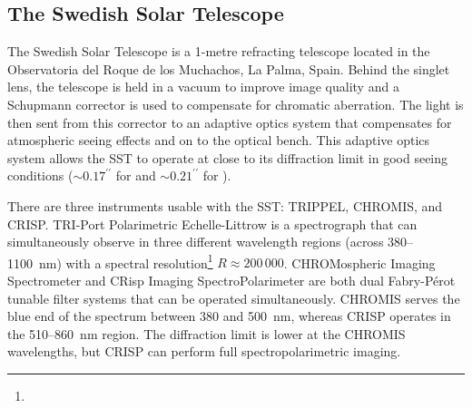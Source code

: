 \subsection{The Swedish Solar Telescope}\label{Sec:CRISP}

The Swedish Solar Telescope \citep[SST,][]{Scharmer2003} is a 1-metre refracting telescope located in the Observatoria del Roque de los Muchachos, La Palma, Spain.
Behind the singlet lens, the telescope is held in a vacuum to improve image quality and a Schupmann corrector is used to compensate for chromatic aberration.
The light is then sent from this corrector to an adaptive optics system that compensates for atmospheric seeing effects and on to the optical bench.
This adaptive optics system allows the SST to operate at close to its diffraction limit in good seeing conditions ($\sim 0.17^{\prime\prime}$ for \Ha{} and $\sim 0.21^{\prime\prime}$ for \CaLine{}). %

There are three instruments usable with the SST: TRIPPEL, CHROMIS, and CRISP.
TRI-Port Polarimetric Echelle-Littrow \citep[TRIPPEL,][]{Kiselman2011} is a spectrograph that can simultaneously observe in three different wavelength regions (across 380--\SI{1100}{\nano\m}) with a spectral resolution\footnote{} $R\approx200\,000$.
CHROMospheric Imaging Spectrometer \citep[CHROMIS,][]{Lofdahl2021} and CRisp Imaging SpectroPolarimeter \citep[CRISP,][]{Scharmer2008,Scharmer2019} are both dual Fabry-Pérot tunable filter systems that can be operated simultaneously.
CHROMIS serves the blue end of the spectrum between 380 and \SI{500}{\nano\m}, whereas CRISP operates in the 510--\SI{860}{\nano\m} region.
The diffraction limit is lower at the CHROMIS wavelengths, but CRISP can perform full spectropolarimetric imaging.

